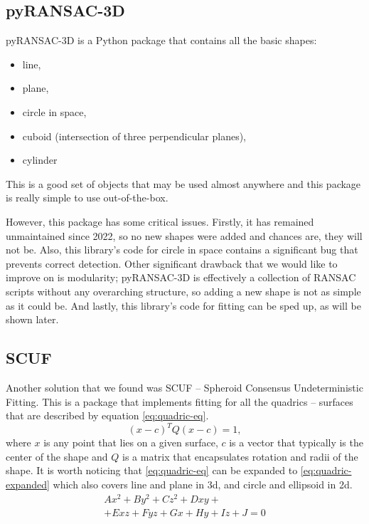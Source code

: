 \documentclass[10pt,conference,a4paper]{IEEEtran_EDM}
\begin{document}
\subsection{pyRANSAC-3D}
pyRANSAC-3D \cite{Mariga_pyRANSAC-3D_2022} is a Python package that contains
all the basic shapes: 
\begin{itemize}
    \item line,
    \item plane,
    \item circle in space,
    \item cuboid (intersection of three perpendicular planes),
    \item cylinder
\end{itemize}
This is a good set of objects that may be used almost anywhere and this package
is really simple to use out-of-the-box.

However, this package has some critical issues. Firstly, it has remained
unmaintained since 2022, so no new shapes were added and chances are, they will
not be. Also, this library's code for circle in space contains a significant bug
that prevents correct detection. Other significant drawback that we would like
to improve on is modularity; pyRANSAC-3D is effectively a collection of RANSAC
scripts without any overarching structure, so adding a new shape is not as
simple as it could be. And lastly, this library's code for fitting can be sped
up, as will be shown later.


\subsection{SCUF}
Another solution that we found was SCUF -- Spheroid Consensus Undeterministic
Fitting. This is a package that implements fitting for all the quadrics --
surfaces that are described by equation \eqref{eq:quadric-eq}.
\begin{equation}
    (x-c)^T Q (x-c) = 1,
    \label{eq:quadric-eq}
\end{equation}
where $x$ is any point that lies on a given surface, $c$ is a vector that
typically is the center of the shape and $Q$ is a matrix that encapsulates
rotation and radii of the shape.
It is worth noticing that \eqref{eq:quadric-eq} can be expanded to
\eqref{eq:quadric-expanded} which also covers line and plane in 3d, and circle
and ellipsoid in 2d.
\begin{multline}
    A x^2 + B y^2 + C z^2 + D xy + \\ 
    + E xz + F yz + G x + H y + I z + J = 0
    \label{eq:quadric-expanded}
\end{multline}
\end{document}
